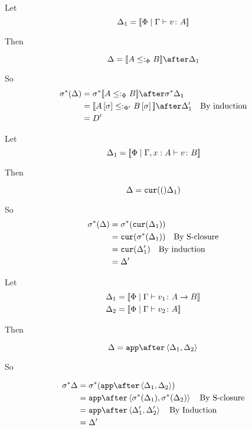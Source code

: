 {Let \begin{equation}
    \Delta_1 = {\bf [\![}\Phi\mid\Gamma \vdash v \colon A{\bf ]\!]}
\end{equation}

Then

\begin{equation}
    \D = \deno{A\subtypep B}\after \D_1\\
\end{equation}

So 
\begin{align}
    \si\star(\D) & = \si\star{\deno{A\subtypep B}}\after\si\star\D_1 \\
    & = \deno{A\ssi\subtypepp B\ssi}\after\D_1'\qt{By induction}\\
    & = D'
\end{align}

Let \begin{equation}
    \Delta_1 = {\bf [\![}\Phi\mid\Gamma, x: A \vdash v \colon B{\bf ]\!]}
\end{equation}

Then

\begin{equation}
    \Delta = \texttt{cur}(()\Delta_1)\\
\end{equation}

So
\begin{align}
    \sigma^*(\Delta) & = \sigma^*(\texttt{cur}(\Delta_1))\\
    & = \texttt{cur}(\sigma^*(\Delta_1))\quad\text{By S-closure}\\
    & = \texttt{cur}(\Delta_1')\quad\text{By induction}\\
    & = \Delta'
\end{align}

Let \begin{align}
    \Delta_1 &= {\bf [\![}\Phi\mid\Gamma \vdash v_1 \colon A\rightarrow B{\bf ]\!]}\\
    \Delta_2 &= {\bf [\![}\Phi\mid\Gamma \vdash v_2 \colon A{\bf ]\!]}
\end{align}

Then

\begin{equation}
    \D = \app\after\pr{\D_1}{\D_2}\\
\end{equation}

So

\begin{align}
    \si\star\D & = \si\star(\app\after\pr{\D_1}{\D_2})\\
    & = \app\after\pr{\si\star(\D_1)}{\si\star(\D_2)}\qt{By S-closure}\\
    & = \app\after\pr{\D_1'}{\D_2'}\qt{By Induction}\\
    & = \D'
\end{align}

}

